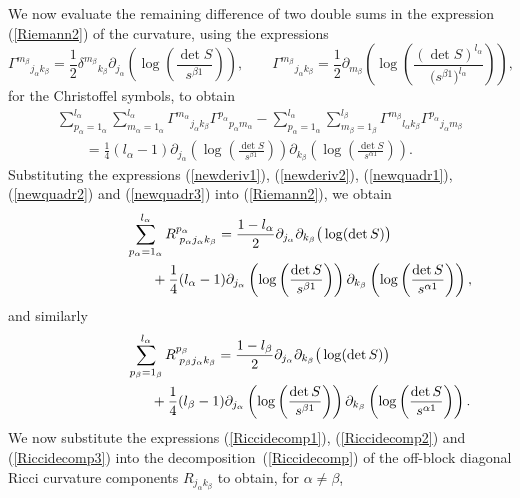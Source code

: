 \documentclass[11pt]{article}
\numberwithin{equation}{section}
\newcommand{\jalpha}{j_{\alpha}}
\newcommand{\kbeta}{k_{\beta}}
\newcommand{\malpha}{m_{\alpha}}
\newcommand{\mbeta}{m_{\beta}}
\newcommand{\lbeta}{l_{\beta}}
\newcommand{\lalpha}{l_{\alpha}}
\newcommand{\palpha}{p_{\alpha}}
\newcommand{\pbeta}{p_{\beta}}
\begin{document}
We now evaluate the remaining difference of two double sums in the expression (\ref{Riemann2}) of the curvature, using the expressions
\[
{\Gamma^{\mbeta}}_{\jalpha \kbeta}=\frac{1}{2}{\delta^{\mbeta}}_{\kbeta}\partial_{\jalpha}\left(\log\left(\frac{\det S}{s^{\beta 1}}  \right)\right), \qquad {\Gamma^{\mbeta}}_{\jalpha \kbeta} = \frac{1}{2}\partial_{\mbeta}\left(\log\left(\frac{(\det S)^{\lalpha}}{\big(s^{\beta 1}\big)^{\lalpha}} \right)\right),
\]
for the Christoffel symbols, to obtain
\begin{gather}
\sum_{\palpha=1_{\alpha}}^{\lalpha}\sum_{\malpha = 1_{\alpha}}^{\lalpha}{\Gamma^{\malpha}}_{\jalpha \kbeta}{\Gamma^{\palpha}}_{\palpha \malpha}-\sum_{\palpha=1_{\alpha}}^{\lalpha}\sum_{\mbeta=1_{\beta}}^{\lbeta}{\Gamma^{\mbeta}}_{\lalpha \kbeta}{\Gamma^{\palpha}}_{\jalpha \mbeta}\nonumber\\
\qquad{} =\frac{1}{4}(\lalpha-1)\partial_{\jalpha}\left(\log \left(\frac{\det S}{s^{\beta 1}}\right)\right)\partial_{\kbeta}\left(\log\left(\frac{\det S}{s^{\alpha 1}} \right)\right).\label{newquadr3}
\end{gather}
Substituting the expressions (\ref{newderiv1}), (\ref{newderiv2}), (\ref{newquadr1}), (\ref{newquadr2}) and (\ref{newquadr3}) into (\ref{Riemann2}), we obtain
\begin{gather}
\sum_{\palpha=1_{\alpha}}^{\lalpha}R^{\palpha}_{{\phantom l} \palpha \jalpha \kbeta}= \frac{1-\lalpha}{2} \partial_{\jalpha}\partial_{\kbeta} \big(\log(\det S)\big)\nonumber\\
\hphantom{\sum_{\palpha=1_{\alpha}}^{\lalpha}R^{\palpha}_{{\phantom l} \palpha \jalpha \kbeta}=}{}
+\frac{1}{4}(\lalpha-1)\partial_{\jalpha}\left(\log\left(\frac{\det S}{s^{\beta 1}}\right)\right)\partial_{\kbeta}\left(\log\left(\frac{\det S}{s^{\alpha 1}}\right)\right),\label{Riccidecomp2}
\end{gather}
and similarly
\begin{gather}\label{Riccidecomp3}
\sum_{\pbeta=1_{\beta}}^{\lalpha}R^{\pbeta}_{{\phantom l} \pbeta \jalpha \kbeta}=\frac{1-\lbeta}{2}\partial_{\jalpha}\partial_{\kbeta} \big(\log(\det S)\big)\nonumber\\
\hphantom{\sum_{\pbeta=1_{\beta}}^{\lalpha}R^{\pbeta}_{{\phantom l} \pbeta \jalpha \kbeta}=}{}
+\frac{1}{4}(\lbeta-1)\partial_{\jalpha}\left(\log\left(\frac{\det S}{s^{\beta 1}}\right)\right)\partial_{\kbeta}\left(\log\left(\frac{\det S}{s^{\alpha 1}}\right)\right).
\end{gather}
We now substitute the expressions (\ref{Riccidecomp1}), (\ref{Riccidecomp2}) and (\ref{Riccidecomp3}) into the decomposition~(\ref{Riccidecomp}) of the off-block diagonal Ricci curvature components $R_{\jalpha \kbeta}$ to obtain, for $\alpha \neq \beta$,
\end{document}

